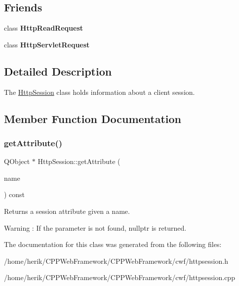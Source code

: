 \subsection*{Friends}
\begin{DoxyCompactItemize}
\item 
\mbox{\label{class_http_session_a4d54f5003e07e218070a449c22a52c7c}} 
class {\bfseries Http\+Read\+Request}
\item 
\mbox{\label{class_http_session_aebfae296d1cbb22eed705b7950266081}} 
class {\bfseries Http\+Servlet\+Request}
\end{DoxyCompactItemize}


\subsection{Detailed Description}
The \hyperlink{class_http_session}{Http\+Session} class holds information about a client session. 

\subsection{Member Function Documentation}
\mbox{\label{class_http_session_acef8380ce20f3adb9d2bb9aad0ff3f46}} 
\subsubsection{\texorpdfstring{get\+Attribute()}{getAttribute()}}
{\footnotesize\ttfamily Q\+Object $\ast$ Http\+Session\+::get\+Attribute (\begin{DoxyParamCaption}\item[{const Q\+String \&}]{name }\end{DoxyParamCaption}) const}



Returns a session attribute given a name. 

\begin{DoxyWarning}{Warning}
\+: If the parameter is not found, nullptr is returned. 
\end{DoxyWarning}


The documentation for this class was generated from the following files\+:\begin{DoxyCompactItemize}
\item 
/home/herik/\+C\+P\+P\+Web\+Framework/\+C\+P\+P\+Web\+Framework/cwf/httpsession.\+h\item 
/home/herik/\+C\+P\+P\+Web\+Framework/\+C\+P\+P\+Web\+Framework/cwf/httpsession.\+cpp\end{DoxyCompactItemize}
